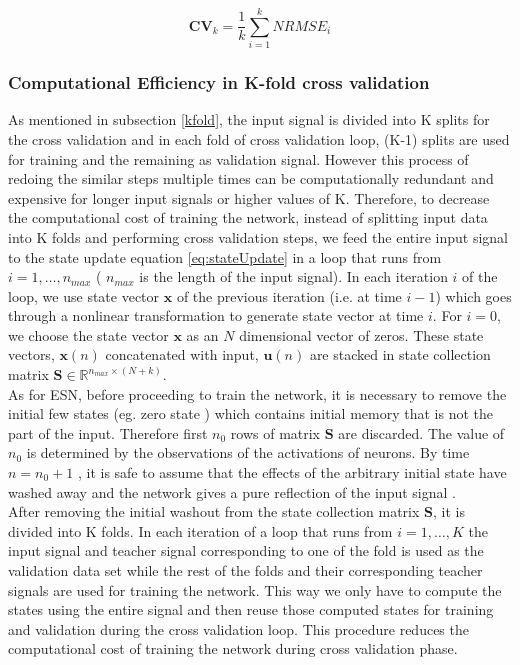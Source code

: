  \begin{equation} \label{eq:crossValidaion}
	 \mathbf{CV}_k = \frac{1}{k} \sum^k_{i=1}{NRMSE_i}
	 \end{equation}
\subsubsection{Computational Efficiency in K-fold cross validation}
As mentioned in subsection \ref{kfold}, the input signal is divided into K splits for the cross validation and in each fold of cross validation loop, (K-1) splits are used for training and the remaining as validation signal. However this process of redoing the similar steps multiple times can be computationally redundant and expensive for longer input signals or higher values of K. Therefore, to decrease the computational cost of training the network, instead of splitting input data into K folds and performing cross validation steps, we feed the entire input signal to the state update equation \eqref{eq:stateUpdate} in a loop that runs from  $i = 1,\hdots,{n_{max}}$ ( ${n_{max}}$ is the length of the input signal). In each iteration $i$ of the loop, we  use state vector $\mathbf{x}$ of the previous iteration (i.e. at time $i-1$) which goes through a nonlinear transformation to generate state vector at time $i$. For $i = 0$,  we choose the	state vector $\mathbf{x}$ as an $N$ dimensional vector of zeros. These state vectors, $\mathbf{x}(n)$ concatenated with input, $\mathbf{u}(n)$ are stacked in state collection matrix $\mathbf{S} \in \mathbb{R}^{n_{max} \times (N+k)}$.  \\


As for ESN, before proceeding to train the network, it is necessary to remove the initial few states (eg. zero state ) which contains initial memory that is not the part of the input. Therefore first $n_0$ rows of matrix $\mathbf{S}$ are discarded. The value of $n_0$ is determined by the observations of the activations of neurons. By time $n = n_0+1$ , it is safe to assume that the effects of the arbitrary initial state have washed away and the network gives a pure reflection of the input signal \cite{jingdai}. \\

After removing the initial washout from the state collection matrix $\mathbf{S}$, it is divided into K folds. In each iteration of a loop that runs from $i=1,\hdots,K$ the input signal and teacher signal corresponding to one of the fold is used as the validation data set while the rest of the  folds and their corresponding teacher signals are used for training the network. This way we only have to compute the states using the entire signal and then reuse those computed states for training and validation during the cross validation loop. This procedure reduces the computational cost of training the network during cross validation phase.

